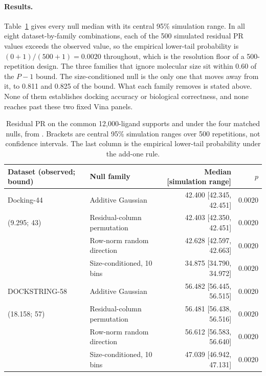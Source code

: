 \paragraph{Results.} Table~\ref{tab:s2nulls} gives every null median with its central 95\%
simulation range. In all eight dataset-by-family combinations, each of the 500 simulated
residual PR values exceeds the observed value, so the empirical lower-tail probability is
$(0+1)/(500+1)=0.0020$ throughout, which is the resolution floor of a 500-repetition design.
The three families that ignore molecular size sit within 0.60 of the $P-1$ bound. The
size-conditioned null is the only one that moves away from it, to 0.811 and 0.825 of the bound.
What each family removes is stated above. None of them establishes docking accuracy or
biological correctness, and none reaches past these two fixed Vina panels.

\begin{table}[htbp]
\centering
\caption{Residual PR on the common 12{,}000-ligand supports and under the four matched nulls,
from \protect{}. Brackets are central 95\%
simulation ranges over 500 repetitions, not confidence intervals. The last column is the
empirical lower-tail probability under the add-one rule.}
\label{tab:s2nulls}
\small
\begin{tabular}{llrr}
\toprule
Dataset (observed; bound) & Null family & Median [simulation range] & $p$ \\
\midrule
Docking-44 & Additive Gaussian & 42.400 [42.345, 42.451] & 0.0020 \\
(9.295; 43) & Residual-column permutation & 42.403 [42.350, 42.451] & 0.0020 \\
 & Row-norm random direction & 42.628 [42.597, 42.663] & 0.0020 \\
 & Size-conditioned, 10 bins & 34.875 [34.790, 34.972] & 0.0020 \\
\addlinespace
DOCKSTRING-58 & Additive Gaussian & 56.482 [56.445, 56.515] & 0.0020 \\
(18.158; 57) & Residual-column permutation & 56.481 [56.438, 56.516] & 0.0020 \\
 & Row-norm random direction & 56.612 [56.583, 56.640] & 0.0020 \\
 & Size-conditioned, 10 bins & 47.039 [46.942, 47.131] & 0.0020 \\
\bottomrule
\end{tabular}
\end{table}

